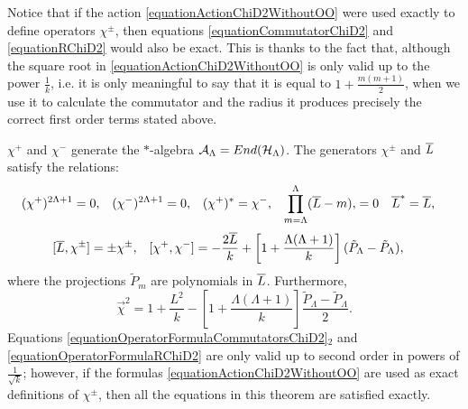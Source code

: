 \begin{remark}
Notice that if the action \eqref{equationActionChiD2WithoutOO} were used exactly to define operators $\chi^\pm$, then equations \eqref{equationCommutatorChiD2} and \eqref{equationRChiD2} would also be exact. This is thanks to the fact that, although the square root in \eqref{equationActionChiD2WithoutOO} is only valid up to the power $\frac{1}{k}$, i.e. it is only meaningful to say that it is equal to $ 1+\frac{m(m+1)}{2}$, when we use it to calculate the commutator and the radius it produces precisely the correct first order terms stated above.
\end{remark}

\begin{theorem}[Summary]
$\chi^+$ and $\chi^-$ generate the $*$-algebra $\mathcal A_\Lambda = End(\mathcal H_\Lambda)$. The generators $\chi^\pm$ and $\overline{L}$ satisfy  the relations:
\begin{align}\label{equationOperatorFormulaRelationsChiD2}
    (\chi^+)^{2\Lambda+1} &= 0, & 
    (\chi^-)^{2\Lambda+1} &= 0, & 
    (\chi^+)^*&= \chi^-, & 
    \prod_{m = \Lambda}^\Lambda (\overline{L} - m), &= 0 & 
    \overline{L}^* &= \overline{L},
\end{align}
\begin{align}\label{equationOperatorFormulaCommutatorsChiD2}
    [\overline{L}, \chi^\pm] &= \pm \chi^\pm,&
    [\chi^+, \chi^-] &= - \frac{2\overline{L}}{k} + \left[ 1 + \frac{\Lambda(\Lambda+1)}{k}\right](\tilde P_\Lambda - \tilde P_\Lambda),
\end{align}
where the projections $\tilde P_m$ are polynomials in $\overline{L}$. Furthermore,
\begin{equation}\label{equationOperatorFormulaRChiD2}
    \vec \chi^2 = 1 + \frac{L^2}{k} - \left[ 1 + \frac{\Lambda(\Lambda+1)}{k}\right]\frac{\tilde P_\Lambda - \tilde P_\Lambda}{2}.
\end{equation}
Equations \eqref{equationOperatorFormulaCommutatorsChiD2}$_2$ and \eqref{equationOperatorFormulaRChiD2} are only valid up to second order in powers of $\frac{1}{\sqrt{k}}$; however, if the formulas \eqref{equationActionChiD2WithoutOO} are used as exact definitions of $\chi^\pm$, then all the equations in this theorem are satisfied exactly.
\end{theorem}








